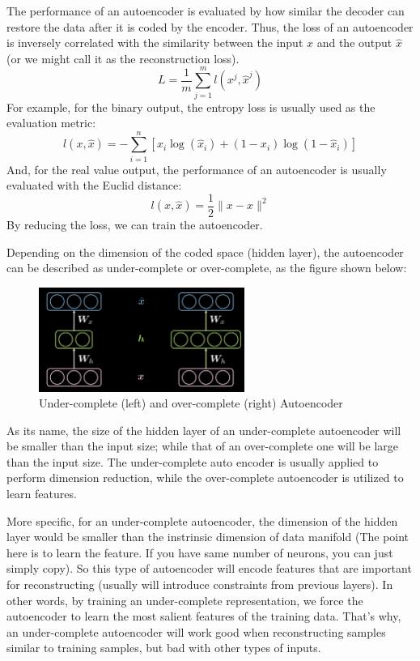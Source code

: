 The performance of an autoencoder is evaluated by how similar the decoder can restore the data after it is coded by the encoder. Thus, the loss of an autoencoder is inversely correlated with the similarity between the input $x$ and the output $\hat{x}$ (or we might call it as the reconstruction loss). 
$$ L=\frac{1}{m}\sum_{j=1}^m l(x^j,\hat{x}^j) $$
For example, for the binary output, the entropy loss is usually used as the evaluation metric:
$$ l(x,\hat{x}) = -\sum_{i=1}^n[x_i\log(\hat{x}_i) + (1-x_i)\log(1-\hat{x}_i) ]$$
And, for the real value output, the performance of an autoencoder is usually evaluated with the Euclid distance:
$$ l(x,\hat{x}) = \frac{1}{2} \| x-\hat{x} \|^2 $$
By reducing the loss, we can train the autoencoder.

Depending on the dimension of the coded space (hidden layer), the autoencoder can be described as under-complete or over-complete, as the figure shown below:

\begin{figure}[htb]
    \centering
    \includegraphics[width=0.6\textwidth]{labs/10/images/Under_(over)_complete_Autoencoder.png}
    \caption{Under-complete (left) and over-complete (right) Autoencoder}
    \label{fig:Under_(over)_complete_Autoencoder}
\end{figure}

As its name, the size of the hidden layer of an under-complete autoencoder will be smaller than the input size; while that of an over-complete one will be large than the input size. The under-complete auto encoder is usually applied to perform dimension reduction, while the over-complete autoencoder is utilized to learn features.

More specific, for an under-complete autoencoder, the dimension of the hidden layer would be smaller than the instrinsic dimension of data manifold (The point here is to learn the feature. If you have same number of neurons, you can just simply copy). So this type of autoencoder will encode features that are important for reconstructing (usually will introduce constraints from previous layers). In other words, by training an under-complete representation, we force the autoencoder to learn the most salient features of the training data. That's why, an under-complete autoencoder will work good when reconstructing samples similar to training samples, but bad with other types of inputs.  

